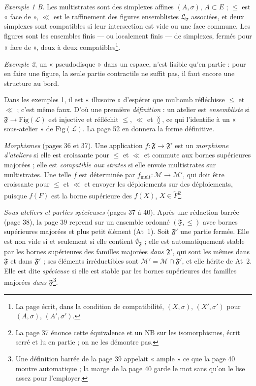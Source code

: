 \documentclass[11pt,a4paper]{article}
\begin{document}
\emph{Exemple 1 B.} Les multistrates sont des simplexes affines $(A, \sigma)$,
$A \subset E$ ; $\leq$ est « face de », $\ll$ est le raffinement des figures
ensemblistes $\mathfrak{L}_{\sigma}$ associées, et deux simplexes sont compatibles
si leur intersection est vide ou une face commune. Les figures sont les
ensembles finis --- ou localement finis --- de simplexes, fermés pour « face
de », deux à deux compatibles\footnote{La page écrit, dans la condition de
compatibilité, $(X, \sigma)$, $(X', \sigma')$ pour $(A, \sigma)$, $(A',
\sigma')$.}.

\emph{Exemple 2}, un « pseudodisque » dans un espace, n'est lisible qu'en partie :
pour en faire une figure, la seule partie contractile ne suffit pas, il faut
encore une structure au bord.

Dans les exemples 1, il est « illusoire » d'espérer que $\mathrm{multomb}$
réfléchisse $\leq$ et $\ll$ ; c'est même faux. D'où une première
\emph{définition} : un atelier est \emph{ensembliste} si $\mathfrak{F} \to
\mathrm{Fig}(\mathcal{L})$ est injective et réfléchit $\leq$, $\ll$ et
$\between$, ce qui l'identifie à un « sous-atelier » de
$\mathrm{Fig}(\mathcal{L})$. La page 52 en donnera la forme définitive.

\emph{Morphismes} (pages 36 et 37). Une application $f : \mathfrak{F} \to
\mathfrak{F}'$ est un \emph{morphisme d'ateliers} si elle est croissante pour
$\leq$ et $\ll$ et commute aux bornes supérieures majorées ; elle est
\emph{compatible aux strates} si elle envoie multistrates sur multistrates. Une
telle $f$ est déterminée par $f_{\mathrm{mult}} : \mathcal{M} \to \mathcal{M}'$,
qui doit être croissante pour $\leq$ et $\ll$ et envoyer les déploiements sur des
déploiements, puisque $f(F)$ est la borne supérieure des $f(X)$, $X \in
\widetilde{F}$\footnote{La page 37 énonce cette équivalence et un NB sur les
isomorphismes, écrit serré et lu en partie ; on ne les démontre pas.}.

\emph{Sous-ateliers et parties spécieuses} (pages 37 à 40). Après une rédaction
barrée (page 38), la page 39 reprend sur un ensemble ordonné $(\mathfrak{F}, \leq)$
avec bornes supérieures majorées et plus petit élément (At~1). Soit
$\mathfrak{F}'$ une partie fermée. Elle est non vide si et seulement si elle
contient $\emptyset_{\mathfrak{F}}$ ; elle est automatiquement stable par les
bornes supérieures des familles majorées \emph{dans $\mathfrak{F}'$}, qui sont les
mêmes dans $\mathfrak{F}$ et dans $\mathfrak{F}'$ ; ses éléments irréductibles
sont $\mathcal{M}' = \mathcal{M} \cap \mathfrak{F}'$, et elle hérite de At~2.
Elle est dite \emph{spécieuse} si elle est stable par les bornes supérieures des
familles majorées \emph{dans $\mathfrak{F}$}\footnote{Une définition barrée de la
page 39 appelait « ample » ce que la page 40 montre automatique ; la marge de la
page 40 garde le mot sans qu'on le lise assez pour l'employer.}.
\end{document}
